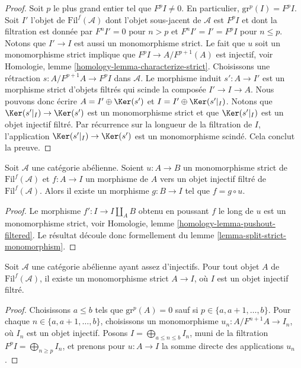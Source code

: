 \begin{proof}
Soit $p$ le plus grand entier tel que $F^pI \not = 0$.
En particulier, $\text{gr}^p(I) = F^pI$.
Soit $I'$ l'objet de $\text{Fil}^f(\mathcal{A})$ dont l'objet sous-jacent de
$\mathcal{A}$ est $F^pI$ et dont la filtration est donnée par
$F^nI' = 0$ pour $n > p$ et $F^nI' = I' = F^pI$ pour $n \leq p$.
Notons que $I' \to I$ est aussi un monomorphisme strict.
Le fait que $u$ soit un monomorphisme strict implique que
$F^pI \to A/F^{p + 1}(A)$ est injectif, voir Homologie, lemme
\ref{homology-lemma-characterize-strict}.
Choisissons une rétraction $s : A/F^{p + 1}A \to F^pI$ dans
$\mathcal{A}$. Le morphisme induit
$s' : A \to I'$ est un morphisme strict d'objets filtrés qui scinde la
composée $I' \to I \to A$.
Nous pouvons donc écrire $A = I' \oplus \Ker(s')$ et
$I = I' \oplus \Ker(s'|_I)$. Notons que
$\Ker(s'|_I) \to \Ker(s')$ est un monomorphisme strict et que
$\Ker(s'|_I)$ est un objet injectif filtré.
Par récurrence sur la longueur de la filtration de $I$, l'application
$\Ker(s'|_I) \to \Ker(s')$ est un monomorphisme scindé. Cela conclut la
preuve.
\end{proof}

\begin{lemma}
\label{lemma-injective-property-filtered-injective}
Soit $\mathcal{A}$ une catégorie abélienne.
Soient $u : A \to B$ un monomorphisme strict de
$\text{Fil}^f(\mathcal{A})$ et $f : A \to I$ un morphisme de $A$ vers un objet
injectif filtré de $\text{Fil}^f(\mathcal{A})$.
Alors il existe un morphisme $g : B \to I$ tel que $f = g \circ u$.
\end{lemma}

\begin{proof}
Le morphisme $f' : I \to I \amalg_A B$ obtenu en poussant $f$ le long de $u$
est un monomorphisme strict, voir Homologie, lemme
\ref{homology-lemma-pushout-filtered}.
Le résultat découle donc formellement du
lemme \ref{lemma-split-strict-monomorphism}.
\end{proof}

\begin{lemma}
\label{lemma-strict-monomorphism-into-filtered-injective}
Soit $\mathcal{A}$ une catégorie abélienne ayant assez d'injectifs.
Pour tout objet $A$ de $\text{Fil}^f(\mathcal{A})$, il existe un monomorphisme
strict $A \to I$, où $I$ est un objet injectif filtré.
\end{lemma}

\begin{proof}
Choisissons $a \leq b$ tels que $\text{gr}^p(A) = 0$ sauf si
$p \in \{a, a + 1, \ldots, b\}$. Pour chaque
$n \in \{a, a + 1, \ldots, b\}$, choisissons un monomorphisme
$u_n : A/F^{n + 1}A \to I_n$, où $I_n$ est un objet injectif.
Posons $I = \bigoplus_{a \leq n \leq b} I_n$, muni de la filtration
$F^pI = \bigoplus_{n \geq p} I_n$, et prenons pour $u : A \to I$ la somme
directe des applications $u_n$.
\end{proof}

